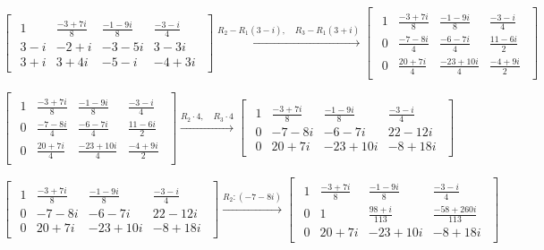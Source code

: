 \documentclass{article}
\begin{document}
\begin{equation}
\begin{bmatrix}
\begin{array}{ccc|c}
1 & \frac{-3+7i}{8} & \frac{-1-9i}{8} & \frac{-3-i}{4}\\ 
3-i & -2+i & -3-5i & 3-3i\\
3+i & 3+4i & -5-i & -4+3i\nonumber
\end{array}
\end{bmatrix}
\xrightarrow{R_2-R_1(3-i),\quad R_3-R_1(3+i)}
\begin{bmatrix}
\begin{array}{ccc|c}
1 & \frac{-3+7i}{8} & \frac{-1-9i}{8} & \frac{-3-i}{4}\\ 
0 & \frac{-7-8i}{4} & \frac{-6-7i}{4} & \frac{11-6i}{2}\\
0 & \frac{20+7i}{4} & \frac{-23+10i}{4} & \frac{-4+9i}{2}\nonumber
\end{array}
\end{bmatrix}
\end{equation}

\begin{equation}
\begin{bmatrix}
\begin{array}{ccc|c}
1 & \frac{-3+7i}{8} & \frac{-1-9i}{8} & \frac{-3-i}{4}\\ 
0 & \frac{-7-8i}{4} & \frac{-6-7i}{4} & \frac{11-6i}{2}\\
0 & \frac{20+7i}{4} & \frac{-23+10i}{4} & \frac{-4+9i}{2}\nonumber
\end{array}
\end{bmatrix}
\xrightarrow{R_2\cdot4,\quad R_3\cdot4}
\begin{bmatrix}
\begin{array}{ccc|c}
1 & \frac{-3+7i}{8} & \frac{-1-9i}{8} & \frac{-3-i}{4}\\ 
0 & -7-8i & -6-7i & 22-12i\\
0 & 20+7i & -23+10i & -8+18i\nonumber
\end{array}
\end{bmatrix}
\end{equation}

\begin{equation}
\begin{bmatrix}
\begin{array}{ccc|c}
1 & \frac{-3+7i}{8} & \frac{-1-9i}{8} & \frac{-3-i}{4}\\ 
0 & -7-8i & -6-7i & 22-12i\\
0 & 20+7i & -23+10i & -8+18i\nonumber
\end{array}
\end{bmatrix}
\xrightarrow{R_2:(-7-8i)}
\begin{bmatrix}
\begin{array}{ccc|c}
1 & \frac{-3+7i}{8} & \frac{-1-9i}{8} & \frac{-3-i}{4}\\ 
0 & 1 & \frac{98+i}{113} & \frac{-58+260i}{113}\\
0 & 20+7i & -23+10i & -8+18i\nonumber
\end{array}
\end{bmatrix}
\end{equation}
\end{document}
